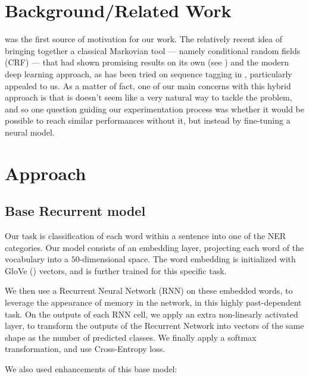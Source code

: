 \documentclass{article} %
\begin{document}
\section{Background/Related Work}


\cite{lample2016neural} was the first source of motivation for our work. The relatively recent idea of bringing together a classical Markovian tool --- namely conditional random fields (CRF) --- that had shown promising results on its own (see \cite{mccallum2003early}) and the modern deep learning approach, as has been tried on sequence tagging in \cite{huang2015bidirectional}, particularly appealed to us. As a matter of fact, one of our main concerns with this hybrid approach is that is doesn't seem like a very natural way to tackle the problem, and so one question guiding our experimentation process was whether it would be possible to reach similar performances without it, but instead by fine-tuning a neural model.




\section{Approach}

\subsection{Base Recurrent model}

Our task is classification of each word within a sentence into one of
the NER categories. Our model consists of an embedding layer, projecting
each word of the vocabulary into a $50$-dimensional space. The word
embedding is initialized with GloVe (\cite{pennington2014glove}) vectors, and is further trained for this specific
task.

We then use a Recurrent Neural Network (RNN) on these embedded words, to
leverage the appearance of memory in the network, in this highly
past-dependent task. On the outputs of each RNN cell, we apply an extra
non-linearly activated layer, to transform the outputs of the Recurrent
Network into vectors of the same shape as the number of predicted
classes. We finally apply a softmax transformation, and use
Cross-Entropy loss.

We also used enhancements of this base model:
\end{document}
